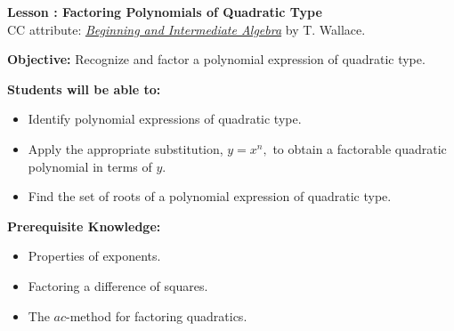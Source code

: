 \documentclass[12pt]{article}
\theoremstyle{definition}
\begin{document}
{\bf \large Lesson : Factoring Polynomials of Quadratic Type}\label{les:factoring_quadratic_type}
\\ CC attribute: \href{http://www.wallace.ccfaculty.org/book/book.html}{\it{Beginning and Intermediate Algebra}} by T. Wallace. 
\hfill \doclicenseImage[imagewidth=5em]\\
\par
{\bf Objective:} Recognize and factor a polynomial expression of quadratic type.\\
\par
{\bf Students will be able to:}
\begin{itemize}
	\item Identify polynomial expressions of quadratic type.
	\item Apply the appropriate substitution, $y=x^n,$ to obtain a factorable quadratic polynomial in terms of $y$.
	\item Find the set of roots of a polynomial expression of quadratic type.
\end{itemize}
{\bf Prerequisite Knowledge:}
\begin{itemize}
	\item Properties of exponents.
	\item Factoring a difference of squares.
	\item The $ac$-method for factoring quadratics.
\end{itemize}
\hrulefill
\end{document}
